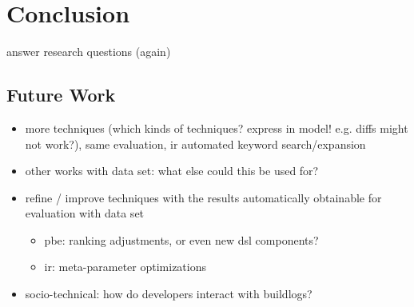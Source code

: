 \documentclass[\myrootdir/main.tex]{subfiles}
\begin{document}
\chapter{Conclusion}
\label{conclusion}
answer research questions (again)

\section{Future Work}
\begin{itemize}
  \item more techniques (which kinds of techniques? express in model! e.g. diffs might not work?), same evaluation, ir automated keyword search/expansion
  \item other works with data set: what else could this be used for?
  \item refine / improve techniques with the results automatically obtainable for evaluation with data set
    \begin{itemize}
      \item pbe: ranking adjustments, or even new dsl components?
      \item ir: meta-parameter optimizations
    \end{itemize}
  \item socio-technical: how do developers interact with buildlogs?
\end{itemize}
\end{document}

